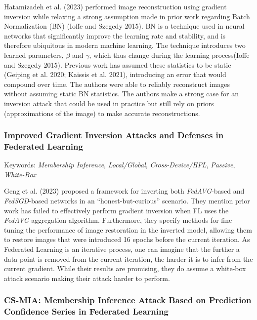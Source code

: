 \documentclass[
  compsoc]{IEEEtran}
\begin{document}
Hatamizadeh et al. (2023) performed image reconstruction using gradient
inversion while relaxing a strong assumption made in prior work
regarding Batch Normalization (BN) (Ioffe and Szegedy 2015). BN is a
technique used in neural networks that significantly improve the
learning rate and stability, and is therefore ubiquitous in modern
machine learning. The technique introduces two learned parameters,
\(\beta\) and \(\gamma\), which thus change during the learning
process(Ioffe and Szegedy 2015). Previous work has assumed these
statistics to be static (Geiping et al. 2020; Kaissis et al. 2021),
introducing an error that would compound over time. The authors were
able to reliably reconstruct images without assuming static BN
statistics. The authors make a strong case for an inversion attack that
could be used in practice but still rely on priors (approximations of
the image) to make accurate reconstructions.

\hypertarget{improved-gradient-inversion-attacks-and-defenses-in-federated-learning}{%
\subsubsection{Improved Gradient Inversion Attacks and Defenses in
Federated
Learning}\label{improved-gradient-inversion-attacks-and-defenses-in-federated-learning}}

Keywords: \emph{Membership Inference}, \emph{Local/Global},
\emph{Cross-Device/HFL}, \emph{Passive}, \emph{White-Box}

Geng et al. (2023) proposed a framework for inverting both
\emph{FedAVG}-based and \emph{FedSGD}-based networks in an
``honest-but-curious'' scenario. They mention prior work has failed to
effectively perform gradient inversion when FL uses the \emph{FedAVG}
aggregation algorithm. Furthermore, they specify methods for fine-tuning
the performance of image restoration in the inverted model, allowing
them to restore images that were introduced 16 epochs before the current
iteration. As Federated Learning is an iterative process, one can
imagine that the further a data point is removed from the current
iteration, the harder it is to infer from the current gradient. While
their results are promising, they do assume a white-box attack scenario
making their attack harder to perform.

\hypertarget{cs-mia-membership-inference-attack-based-on-prediction-confidence-series-in-federated-learning}{%
\subsubsection{CS-MIA: Membership Inference Attack Based on Prediction
Confidence Series in Federated
Learning}\label{cs-mia-membership-inference-attack-based-on-prediction-confidence-series-in-federated-learning}}
\end{document}
